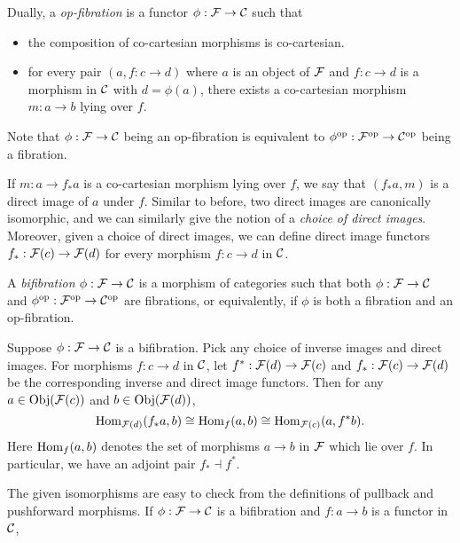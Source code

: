 \documentclass{amsart}
\begin{document}
\begin{definition}
    Dually, a \emph{op-fibration} is a functor $\phi:\mathcal F\to \mathcal C$ such that
    \begin{itemize}
        \item the composition of co-cartesian morphisms is co-cartesian.
        \item for every pair $(a,f:c\to d)$ where $a$ is an object of $\mathcal F$
            and $f:c\to d$ is a morphism in $\mathcal C$ with $d=\phi(a)$,
            there exists a co-cartesian morphism $m:a\to b$ lying over $f$.
    \end{itemize}
    Note that $\phi:\mathcal F\to \mathcal C$ being an op-fibration is equivalent to
        $\phi^{\operatorname{op}}:\mathcal F^{\operatorname{op}}\to \mathcal C^{\operatorname{op}}$ being a fibration.
    
    If $m:a\to f_\ast a$ is a co-cartesian morphism
        lying over $f$, we say that $(f_\ast a,m)$
        is a direct image of $a$ under $f$.
    Similar to before, two direct images are canonically isomorphic,
        and we can similarly give the notion of a \emph{choice of direct images}.
    Moreover, given a choice of direct images, we can define
        direct image functors $f_\ast:\mathcal F(c)\to \mathcal F(d)$
        for every morphism $f:c\to d$ in $\mathcal C$.
\end{definition}
\begin{definition}
    A \emph{bifibration} $\phi:\mathcal F \to \mathcal C$ is a morphism of categories
        such that both $\phi:\mathcal F\to \mathcal C$ and $\phi^{\operatorname{op}}:\mathcal F^{\operatorname{op}}\to \mathcal C^{\operatorname{op}}$
        are fibrations,
        or equivalently, if $\phi$ is both a fibration and an op-fibration.
\end{definition}
\begin{proposition}
    Suppose $\phi:\mathcal F\to \mathcal C$ is a bifibration.
    Pick any choice of inverse images and direct images.
    For morphisms $f:c\to d$ in $\mathcal C$, let
        $f^\ast:\mathcal F(d)\to \mathcal F(c)$
        and $f_\ast:\mathcal F(c)\to \mathcal F(d)$ be the corresponding inverse and direct image functors.
    Then for any $a\in \operatorname{Obj}(\mathcal F(c))$ and $b\in \operatorname{Obj}(\mathcal F(d))$,
    \[
        \operatorname{Hom}_{\mathcal F(d)}(f_\ast a, b)
        \cong \operatorname{Hom}_{f}(a,b)
        \cong \operatorname{Hom}_{\mathcal F(c)}(a,f^\ast b).
    \]
    Here $\operatorname{Hom}_f(a,b)$ denotes the set of morphisms $a\to b$ in $\mathcal F$ which lie over $f$.
    In particular, we have an adjoint pair $f_\ast \dashv f^\ast$.
\end{proposition}
The given isomorphisms are easy to check from the definitions of pullback and pushforward morphisms.
If $\phi:\mathcal F\to \mathcal C$ is a bifibration and $f:a\to b$ is a functor in $\mathcal C$,
\end{document}
